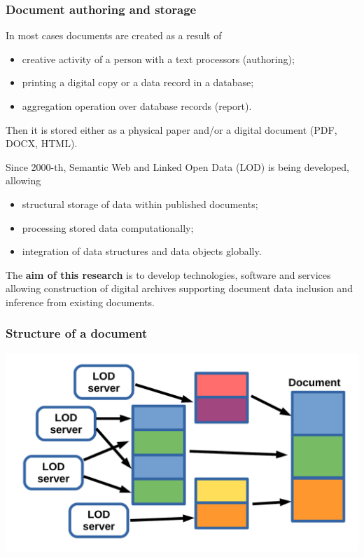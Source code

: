 \documentclass[10pt]{beamer}
\begin{document}
\begin{frame}
  \frametitle{Document authoring and storage}
  In most cases documents are created as a result of
  \begin{itemize}
  \item creative activity of a person with a text processors (authoring);
  \item printing a digital copy or a data record in a database;
  \item aggregation operation over database records (report).
  \end{itemize}
  Then it is stored either as a physical paper and/or a digital document (PDF, DOCX, HTML).

  Since 2000-th, Semantic Web and Linked Open Data (LOD) is being developed, allowing
  \begin{itemize}
  \item structural storage of data within published documents;
  \item processing stored data computationally;
  \item integration of data structures and data objects globally.
  \end{itemize}

  The \textbf{aim of this research} is to develop technologies, software and services allowing construction of digital archives supporting document data inclusion and inference from existing documents.
\end{frame}

\begin{frame}
  \frametitle{Structure of a document}
  \centering
  \includegraphics[width=1\linewidth]{document-structural-view.pdf}
\end{frame}
\end{document}

